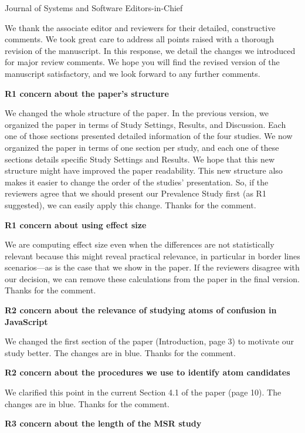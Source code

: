 \documentclass{letter}
\begin{document}
\begin{letter}{Journal of Systems and Software Editors-in-Chief}
  
  \opening{}

  We thank the associate editor and reviewers
  for their detailed, constructive comments. We took great care to address all points raised
  with a thorough revision of the manuscript. In this response, we detail the changes we introduced for major
  review comments. We hope you will find the revised version of the manuscript satisfactory,
  and we look forward to any further comments.


{\bf R1 concern about the paper's structure}

We changed the whole structure of the paper. In the previous version,
we organized the paper in terms of Study Settings, Results, and Discussion.
Each one of those sections presented detailed information of the four studies.
We now organized the paper in terms of one section per study, and each
one of these sections details specific Study Settings and Results. We
hope that this new structure might have improved the paper readability.
This new structure also makes it easier to change the order of the
studies' presentation. So, if the reviewers agree that we should
present our Prevalence Study first (as R1 suggested), we can easily
apply this change. Thanks for the comment. 

{\bf R1 concern about using effect size}

We are computing effect size even when the differences are
not statistically relevant because this might reveal practical
relevance, in particular in border lines scenarios---as is the case
that we show in the paper. If the reviewers disagree with our
decision, we can remove these calculations from the paper in the
final version. Thanks for the comment. 

{\bf R2 concern about the relevance of studying atoms of confusion in JavaScript}

We changed the first section of the paper (Introduction, page 3) to motivate our study better. The
changes are in {\color{blue}blue}. Thanks for the comment. 

{\bf R2 concern about the procedures we use to identify atom candidates}

We clarified this point in the current Section 4.1 of the paper (page 10). The changes are in
{\color{blue}blue}. Thanks for the comment.


{\bf R3 concern about the length of the MSR study}


\end{letter}
\end{document}
